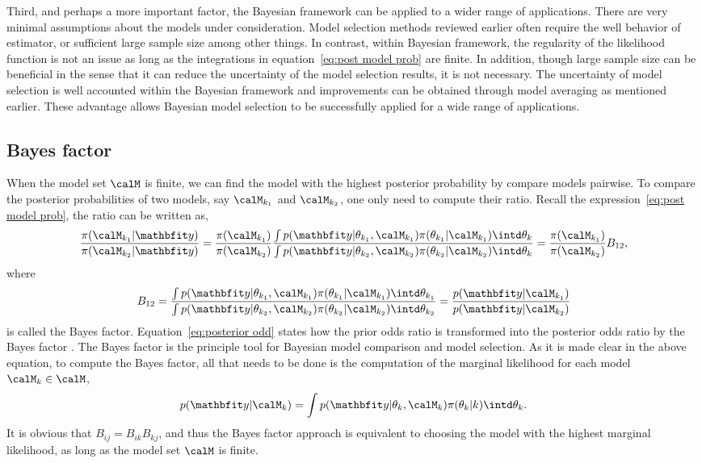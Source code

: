 Third, and perhaps a more important factor, the Bayesian framework can be
applied to a wider range of applications. There are very minimal assumptions
about the models under consideration. Model selection methods reviewed earlier
often require the well behavior of estimator, or sufficient large sample size
among other things. In contrast, within Bayesian framework, the regularity of
the likelihood function is not an issue as long as the integrations in
equation~\ref{eq:post model prob} are finite. In addition, though large sample
size can be beneficial in the sense that it can reduce the uncertainty of the
model selection results, it is not necessary. The uncertainty of model
selection is well accounted within the Bayesian framework and improvements can
be obtained through model averaging as mentioned earlier. These advantage
allows Bayesian model selection to be successfully applied for a wide range of
applications.

\subsection{Bayes factor}
\label{sub:Bayes factor}

When the model set $\calM$ is finite, we can find the model with the highest
posterior probability by compare models pairwise. To compare the posterior
probabilities of two models, say $\calM_{k_1}$ and $\calM_{k_2}$, one only
need to compute their ratio. Recall the expression~\eqref{eq:post model prob},
the ratio can be written as,
\begin{equation}
  \frac{\pi(\calM_{k_1}|\data)}{\pi(\calM_{k_2}|\data)}
  = \frac{\pi(\calM_{k_1})}{\pi(\calM_{k_2})} \frac
  {\int p(\data|\theta_{k_1},\calM_{k_1})\pi(\theta_{k_1}|\calM_{k_1})
      \intd\theta_k}
  {\int p(\data|\theta_{k_2},\calM_{k_2})\pi(\theta_{k_2}|\calM_{k_2})
      \intd\theta_k}
  = \frac{\pi(\calM_{k_1})}{\pi(\calM_{k_2})}B_{12},
  \label{eq:posterior odd}
\end{equation}
where
\begin{equation}
  B_{12} = \frac
  {\int p(\data|\theta_{k_1},\calM_{k_1})\pi(\theta_{k_1}|\calM_{k_1})
      \intd\theta_{k_1}}
  {\int p(\data|\theta_{k_2},\calM_{k_2})\pi(\theta_{k_2}|\calM_{k_2})
      \intd\theta_{k_2}}
    = \frac{p(\data|\calM_{k_1})}{p(\data|\calM_{k_2})}
  \label{eq:bayes factor}
\end{equation}
is called the Bayes factor. Equation~\eqref{eq:posterior odd} states how the
prior odds ratio is transformed into the posterior odds ratio by the Bayes
factor \cite{Kass:1995vb}. The Bayes factor is the principle tool for
Bayesian model comparison and model selection. As it is made clear in the
above equation, to compute the Bayes factor, all that needs to be done is the
computation of the marginal likelihood for each model $\calM_k\in\calM$,
\begin{equation}
  p(\data|\calM_k) =
  \int p(\data|\theta_k,\calM_k)\pi(\theta_k|k)\intd\theta_k.
\end{equation}
It is obvious that $B_{ij} = B_{ik} B_{kj}$, and thus the Bayes
factor approach is equivalent to choosing the model with the highest marginal
likelihood, as long as the model set $\calM$ is finite.


